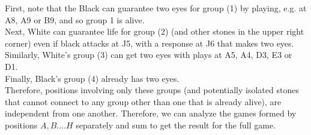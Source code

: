 \documentclass[../math194_paper.tex]{subfiles}
\begin{document}
\begin{figure}[H]
    \centering
    \begin{psgoboard}[9]
    
    
    
    
    
    
    
    
    
    
    \end{psgoboard}
\end{figure}
First, note that the Black can guarantee two eyes for group (1) by playing, e.g. at A8, A9 or B9, and 
so group 1 is alive. \\
Next, White can guarantee life for group (2) (and other stones in the upper right corner) even if 
black attacks at J5, with a response at J6 that makes two eyes. \\
Similarly, White's group (3) can get two eyes with plays at A5, A4, D3, E3 or D1. \\
Finally, Black's group (4) already has two eyes. \\
Therefore, positions involving only these groups (and potentially isolated stones that cannot connect 
to any group other than one that is already alive), are independent from one another. Therefore, we 
can analyze the games formed by positions $A, B. \ldots H$ separately and sum to get the result 
for the full game. \\
\end{document}
